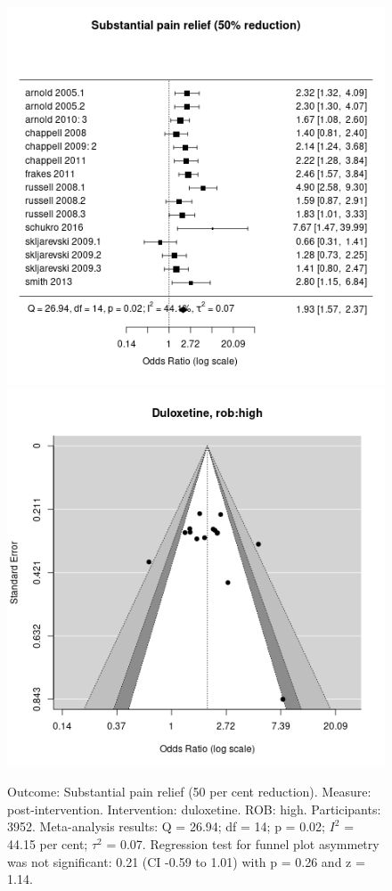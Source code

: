 \documentclass{report}\usepackage[]{graphicx}\usepackage[]{color}
\newenvironment{knitrout}{}{} %
\begin{document}
\begin{figure}

\begin{knitrout}
\color{fgcolor}
\includegraphics[width=0.5\linewidth,height=0.35\textheight]{img/pain_sub-duloxetine-rob-high-forest} 
\includegraphics[width=0.5\linewidth,height=0.35\textheight]{img/pain_sub-duloxetine-rob-high-funnel} 
\end{knitrout}

\caption[Substantial pain: duloxetine, high ROB]{Outcome: Substantial pain relief  (50 per cent reduction). Measure: post-intervention. Intervention: duloxetine. ROB: high. Participants: 3952. Meta-analysis results: Q = 26.94; df = 14; p = 0.02; $I^2$ = 44.15 per cent; $\tau^2$ = 0.07. Regression test for funnel plot asymmetry was not significant: 0.21 (CI -0.59 to 1.01) with p = 0.26 and z = 1.14.
}
\label{fig:subpain-highrob-dulox}
\end{figure}
\end{document}
